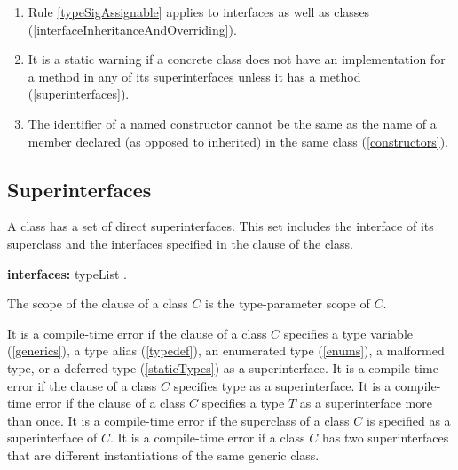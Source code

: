 \documentclass{article}
\begin{document}
{\begin{enumerate}
\begin{itemize}
\end{itemize} (\ref{interfaceInheritanceAndOverriding})
\item Rule \ref{typeSigAssignable} applies to interfaces as well as classes (\ref{interfaceInheritanceAndOverriding}).
\item It is a static warning if a concrete class does not have an implementation for a method in any of its superinterfaces unless it has a  method (\ref{superinterfaces}).
\item The identifier of a named constructor cannot be the same as the name of a member declared (as opposed to inherited) in the same class (\ref{constructors}).
\end{enumerate}
}



\subsection{Superinterfaces}

\LMHash{}
A class has a set of direct superinterfaces.
This set includes the interface of its superclass and the interfaces specified in the \IMPLEMENTS{} clause of the class.

\begin{grammar}
{\bf interfaces:}\IMPLEMENTS{} typeList
  .
\end{grammar}

\LMHash{}
The scope of the \IMPLEMENTS{} clause of a class $C$ is the type-parameter scope of $C$.

\LMHash{}
It is a compile-time error if the \IMPLEMENTS{} clause of a class $C$ specifies a type variable (\ref{generics}), a type alias (\ref{typedef}), an enumerated type (\ref{enums}), a malformed type, or a deferred type (\ref{staticTypes}) as a superinterface.
It is a compile-time error if the \IMPLEMENTS{} clause of a class $C$ specifies type \DYNAMIC{} as a superinterface.
It is a compile-time error if the \IMPLEMENTS{} clause of a class $C$ specifies a type $T$ as a superinterface more than once.
It is a compile-time error if the superclass of a class $C$ is specified as a superinterface of $C$.
It is a compile-time error if a class $C$ has two superinterfaces that are different instantiations of the same generic class. 
\end{document}
